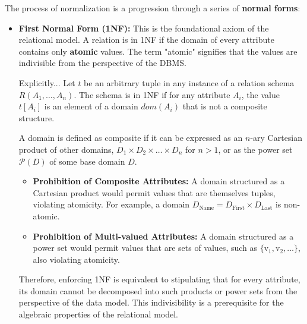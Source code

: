 \noindent The process of normalization is a progression through a series of \textbf{normal forms}:
\begin{itemize}
    \item \textbf{First Normal Form (1NF):} This is the foundational axiom of the relational model. A relation is in 1NF if the domain of every attribute contains only \textbf{atomic} values. The term "atomic" signifies that the values are indivisible from the perspective of the DBMS.

    \begin{remark}
    Explicitly... Let $t$ be an arbitrary tuple in any instance of a relation schema $R(A_1, \dots, A_n)$. The schema is in 1NF if for any attribute $A_i$, the value $t[A_i]$ is an element of a domain $dom(A_i)$ that is not a composite structure.

    A domain is defined as composite if it can be expressed as an $n$-ary Cartesian product of other domains, $D_1 \times D_2 \times \dots \times D_n$ for $n > 1$, or as the power set $\mathcal{P}(D)$ of some base domain $D$.
    \begin{itemize}
        \item \textbf{Prohibition of Composite Attributes:} A domain structured as a Cartesian product would permit values that are themselves tuples, violating atomicity. For example, a domain $D_{\text{Name}} = D_{\text{First}} \times D_{\text{Last}}$ is non-atomic.
        \item \textbf{Prohibition of Multi-valued Attributes:} A domain structured as a power set would permit values that are sets of values, such as $\{ \text{v}_1, \text{v}_2, \dots \}$, also violating atomicity.
    \end{itemize}
    Therefore, enforcing 1NF is equivalent to stipulating that for every attribute, its domain cannot be decomposed into such products or power sets from the perspective of the data model. This indivisibility is a prerequisite for the algebraic properties of the relational model.
    \end{remark}
    

\end{itemize}
